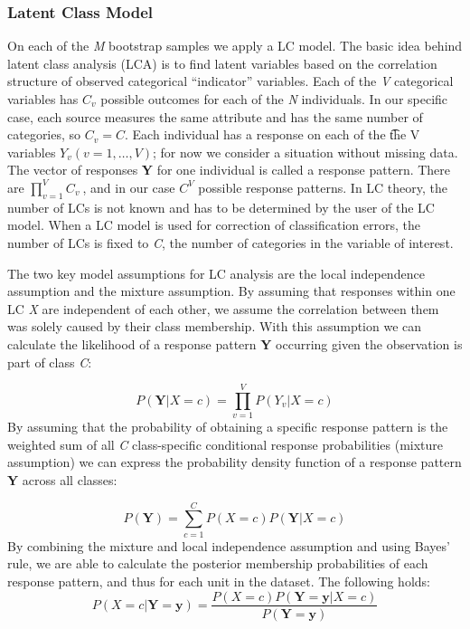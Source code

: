 \documentclass[a4paper, 11pt]{article} %
\begin{document}
\subsubsection{Latent Class Model}
On each of the \textit{M} bootstrap samples we apply a LC model. The basic idea behind latent class analysis (LCA) is to find latent variables based on the correlation structure of observed categorical “indicator” variables. Each of the \textit{V} categorical variables has $C_v$ possible outcomes for each of the \textit{N} individuals. In our specific case, each source measures the same attribute and has the same number of categories, so $C_v = C$. Each individual has a response on each of the \t the {V} variables $Y_v \left(v=1,\ldots,V\right)$; for now we consider a situation without missing data. 
The vector of responses \textbf{Y} for one individual is called a response pattern. There are $\prod_{v=1}^{V}C_v\ $, and in our case $C^V$ possible response patterns. In LC theory, the number of LCs is not known and has to be determined by the user of the LC model. When a LC model is used for correction of classification errors, the number of LCs is fixed to \textit{C}, the number of categories in the variable of interest. 


The two key model assumptions for LC analysis are the local independence assumption and the mixture assumption. By assuming that responses within one LC \textit{X} are independent of each other, we assume the correlation between them was solely caused by their class membership. With this assumption we can calculate the likelihood of a response pattern \textbf{Y} occurring given the observation is part of class \textit{C}:

\begin{equation}
  P\left({\textbf{Y}}|X=c\right)=\prod_{v=1}^{V}P\left(Y_v|X=c\right)
\end{equation}
By assuming that the probability of obtaining a specific response pattern is the weighted sum of all \textit{C} class-specific conditional response probabilities (mixture assumption) we can express the probability density function of a response pattern \textbf{Y} across all classes:  
 
 \begin{equation}
P\left({\textbf{Y}}\right)=\sum_{c=1}^{C}P\left(X=c\right)P\left({\textbf{Y}}|X=c\right)	
 \end{equation}
By combining the mixture and local independence assumption and using Bayes’ rule, we are able to calculate the posterior membership probabilities of each response pattern, and thus for each unit in the dataset. The following holds:
\begin{equation}
 P\left(X=c |{\textbf{Y}}=
 {\textbf{y}}\right)=\frac{P\left(X=c\right)P\left({\textbf{Y}}={\textbf{y}}|X=c\right)}{P\left({\textbf{Y}}={\textbf{y}}\right)}    
\end{equation}
\end{document}
